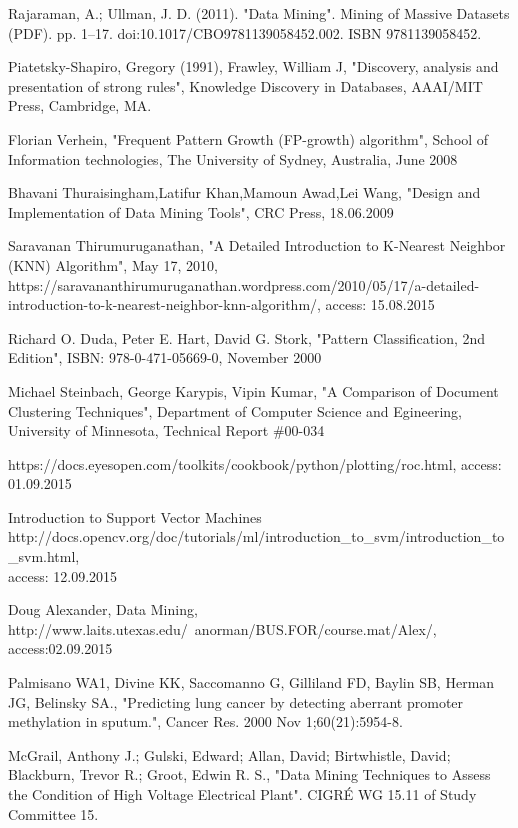 \begin{thebibliography}{99}
Rajaraman, A.; Ullman, J. D. (2011). "Data Mining". Mining of Massive Datasets (PDF). pp. 1–17. doi:10.1017/CBO9781139058452.002. ISBN 9781139058452.

Piatetsky-Shapiro, Gregory (1991), Frawley, William J, "Discovery, analysis and presentation of strong rules", Knowledge Discovery in Databases, AAAI/MIT Press, Cambridge, MA.

Florian Verhein, "Frequent Pattern Growth (FP-growth) algorithm", School of Information technologies, The University of Sydney, Australia, June 2008

Bhavani Thuraisingham,Latifur Khan,Mamoun Awad,Lei Wang, "Design and Implementation of Data Mining Tools", CRC Press, 18.06.2009

Saravanan Thirumuruganathan, "A Detailed Introduction to K-Nearest Neighbor (KNN) Algorithm", May 17, 2010, https://saravananthirumuruganathan.wordpress.com/2010/05/17/a-detailed-introduction-to-k-nearest-neighbor-knn-algorithm/, access: 15.08.2015

Richard O. Duda, Peter E. Hart, David G. Stork, "Pattern Classification, 2nd Edition", ISBN: 978-0-471-05669-0, November 2000

Michael Steinbach, George Karypis, Vipin Kumar, "A Comparison of Document Clustering Techniques", Department of Computer Science and Egineering,  University of Minnesota, Technical Report \#00-034 

https://docs.eyesopen.com/toolkits/cookbook/python/plotting/roc.html, access: 01.09.2015

Introduction to Support Vector Machines \\ http://docs.opencv.org/doc/tutorials/ml/introduction\_to\_svm/introduction\_to\_svm.html,\\
access: 12.09.2015

Doug Alexander, Data Mining, http://www.laits.utexas.edu/~anorman/BUS.FOR/course.mat/Alex/, access:02.09.2015

Palmisano WA1, Divine KK, Saccomanno G, Gilliland FD, Baylin SB, Herman JG, Belinsky SA., "Predicting lung cancer by detecting aberrant promoter methylation in sputum.", Cancer Res. 2000 Nov 1;60(21):5954-8.

McGrail, Anthony J.; Gulski, Edward; Allan, David; Birtwhistle, David; Blackburn, Trevor R.; Groot, Edwin R. S., "Data Mining Techniques to Assess the Condition of High Voltage Electrical Plant". CIGRÉ WG 15.11 of Study Committee 15.


\end{thebibliography}
